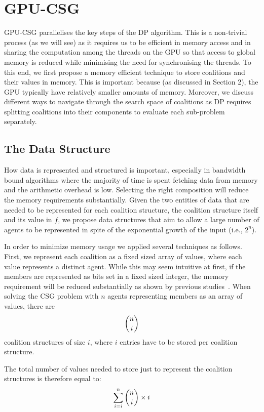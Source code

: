\documentclass{llncs}
\begin{document}
\section{GPU-CSG} \label{sec:gpu-csg} %
GPU-CSG parallelises the key steps of the DP algorithm. This is a non-trivial process (as we will see) as it requires us to be efficient in memory access and in sharing the computation among the threads on the GPU so that access to global memory is reduced while minimising the need for synchronising the threads. To this end, we first propose a memory efficient technique to store coalitions and their values in memory. This is important because (as discussed  in Section 2), the GPU typically have relatively smaller amounts of memory. Moreover, we discuss different ways to navigate through the search space of coalitions as DP requires splitting coalitions into their components to evaluate each sub-problem separately.
\subsection{The Data Structure}\label{sec:data}
How data is represented and structured is important, especially in bandwidth bound algorithms where the majority of time is spent fetching data from memory and the arithmetic overhead is low.
Selecting the right composition will reduce the memory requirements substantially. Given the two entities of data that are needed to be represented for each coalition structure, the coalition structure itself and its value in $f$, we propose data structures that aim to allow a large number of agents to be represented in spite of the exponential growth of the input (i.e., $2^n$).

In order to minimize memory usage we applied several techniques as follows. First, we represent each coalition as a fixed sized array of values, where each value represents a distinct agent. While this may seem intuitive at first, if the members are represented as bits set in a fixed sized integer, the memory
requirement will be reduced substantially as shown by previous studies~\cite{boyer2012solving}.
When solving the CSG problem with $n$ agents representing members as an array of values, there are \[\dbinom{n}{i}\] coalition structures of size $i$, where $i$ entries have to be stored per coalition structure.

The total number of values needed to store just to represent the coalition structures is therefore equal to:
\begin{displaymath}\sum_{i=i}^{n} \dbinom{n}{i}\times i\end{displaymath}
\end{document}
